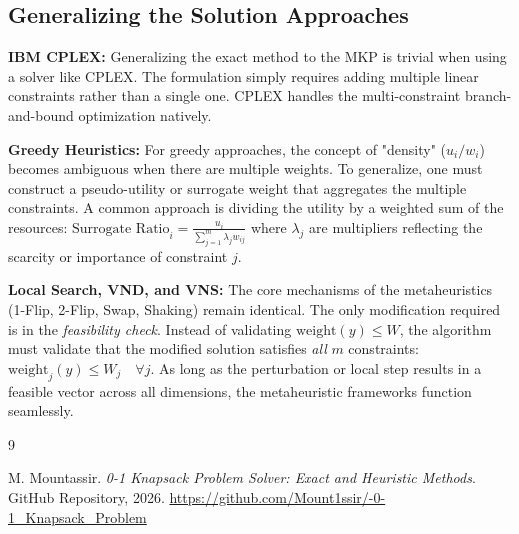 \documentclass[11pt,a4paper]{article}
\begin{document}
\subsection{Generalizing the Solution Approaches}
\textbf{IBM CPLEX:} Generalizing the exact method to the MKP is trivial when using a solver like CPLEX. The formulation simply requires adding multiple linear constraints rather than a single one. CPLEX handles the multi-constraint branch-and-bound optimization natively.

\textbf{Greedy Heuristics:} For greedy approaches, the concept of "density" ($u_i / w_i$) becomes ambiguous when there are multiple weights. To generalize, one must construct a pseudo-utility or surrogate weight that aggregates the multiple constraints. A common approach is dividing the utility by a weighted sum of the resources:
$ \text{Surrogate Ratio}_i = \frac{u_i}{\sum_{j=1}^{m} \lambda_j w_{ij}} $
where $\lambda_j$ are multipliers reflecting the scarcity or importance of constraint $j$.

\textbf{Local Search, VND, and VNS:} The core mechanisms of the metaheuristics (1-Flip, 2-Flip, Swap, Shaking) remain identical. The only modification required is in the \textit{feasibility check}. Instead of validating $\text{weight}(y) \leq W$, the algorithm must validate that the modified solution satisfies \textit{all} $m$ constraints: $ \text{weight}_j(y) \leq W_j \quad \forall j$. As long as the perturbation or local step results in a feasible vector across all dimensions, the metaheuristic frameworks function seamlessly.

\begin{thebibliography}{9}

M. Mountassir.
\textit{0-1 Knapsack Problem Solver: Exact and Heuristic Methods}.
GitHub Repository, 2026. 
\url{https://github.com/Mount1ssir/-0-1_Knapsack_Problem}
\end{thebibliography}

\newpage
\appendix
\end{document}
